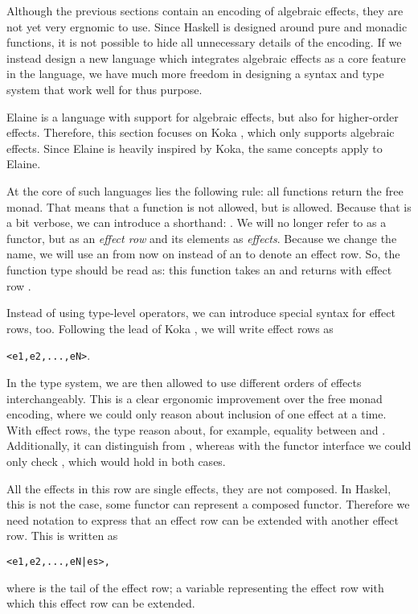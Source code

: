 Although the previous sections contain an encoding of algebraic effects, they are not yet very ergnomic to use. Since Haskell is designed around pure and monadic functions, it is not possible to hide all unnecessary details of the encoding. If we instead design a new language which integrates algebraic effects as a core feature in the language, we have much more freedom in designing a syntax and type system that work well for thus purpose.

Elaine is a language with support for algebraic effects, but also for higher-order effects. Therefore, this section focuses on Koka \autocite{leijen_koka_2014,leijen_koka_2023}, which only supports algebraic effects. Since Elaine is heavily inspired by Koka, the same concepts apply to Elaine.

At the core of such languages lies the following rule: all functions return the free monad. That means that a function  is not allowed, but  is allowed. Because that is a bit verbose, we can introduce a shorthand: . We will no longer refer to  as a functor, but as an \emph{effect row} and its elements as \emph{effects}. Because we change the name, we will use an  from now on instead of an  to denote an effect row. So, the function type  should be read as: this function takes an  and returns  with effect row .

Instead of using type-level operators, we can introduce special syntax for effect rows, too. Following the lead of Koka \autocite{leijen_koka_2014}, we will write effect rows as
\begin{center}\texttt{<e1,e2,...,eN>}.\end{center}
In the type system, we are then allowed to use different orders of effects interchangeably. This is a clear ergonomic improvement over the free monad encoding, where we could only reason about inclusion of one effect at a time. With effect rows, the type reason about, for example, equality between  and . Additionally, it can distinguish  from , whereas with the functor interface we could only check , which would hold in both cases.

All the effects in this row are single effects, they are not composed. In Haskel, this is not the case, some functor  can represent a composed functor. Therefore we need notation to express that an effect row can be extended with another effect row. This is written as
\begin{center}\texttt{<e1,e2,...,eN|es>,}\end{center}
where  is the tail of the effect row; a variable representing the effect row with which this effect row can be extended.

